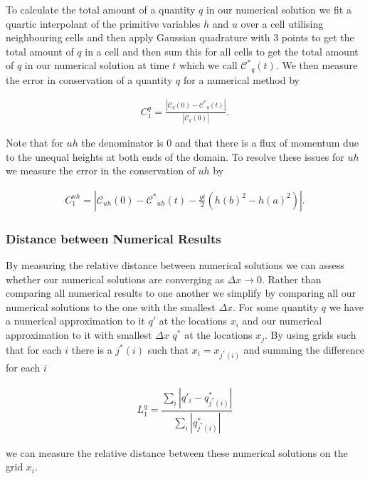 \documentclass[times]{elsarticle}
\begin{document}
To calculate the total amount of a quantity $q$ in our numerical solution we fit a quartic interpolant of the primitive variables $h$ and $u$ over a cell utilising neighbouring cells and then apply Gaussian quadrature with 3 points to get the total amount of $q$ in a cell and then sum this for all cells to get the total amount of $q$ in our numerical solution at time $t$ which we call $\mathcal{C^*}_{q}(t)$. We then measure the error in conservation of a quantity $q$ for a numerical method by
\begin{linenomath*}
		\begin{gather}
		C_1^q = \frac{\left| \mathcal{C}_{q}(0) - \mathcal{C^*}_{q}(t) \right| }{\left|\mathcal{C}_{q}(0)\right|}.
		\end{gather}
\end{linenomath*}
Note that for $uh$ the denominator is $0$ and that there is a flux of momentum due to the unequal heights at both ends of the domain. To resolve these issues for $uh$ we measure the error in the conservation of $uh$ by
\begin{linenomath*}
	\begin{gather}
	C_1^{uh} = \left| \mathcal{C}_{uh}(0) - \mathcal{C^*}_{uh}(t) - \frac{gt}{2}\left(h(b)^2 - h(a)^2\right)\right|  .
	\label{eq:C1def}
	\end{gather}
\end{linenomath*}
\subsubsection{Distance between Numerical Results}
By measuring the relative distance between numerical solutions we can assess whether our numerical solutions are converging as $\Delta x  \rightarrow 0$. Rather than comparing all numerical results to one another we simplify by comparing all our numerical solutions to the one with the smallest $\Delta x$. For some quantity $q$ we have a numerical approximation to it $q'$ at the locations $x_i$ and our numerical approximation to it with smallest $\Delta x$ $q^*$ at the locations $x_j$. By using grids such that for each $i$ there is a $j^*(i)$ such that $x_i = x_{j^*(i)}$ and summing the difference for each $i$
\begin{linenomath*}
	\begin{gather}
	L_1^{q} = \dfrac{\sum_{i} \left| q'_i  - q^*_{j^*(i)}\right|}{\sum_{i} \left| q^*_{j^*(i)}\right|}
	\label{eq:L1def}
	\end{gather}
\end{linenomath*}
we can measure the relative distance between these numerical solutions on the grid $x_i$.
\end{document}
